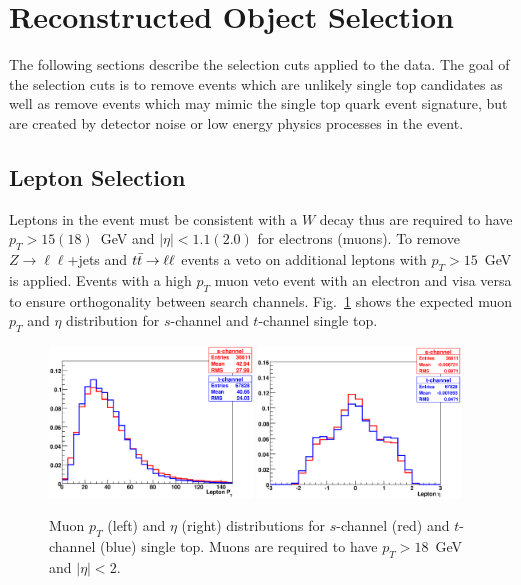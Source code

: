 \section{Reconstructed Object Selection}
\label{objectselection}

The following sections describe the selection cuts applied to the data. The goal of the selection cuts is to remove events which are unlikely single top candidates as well as remove events which may mimic the single top quark event signature, but are created by detector noise or low energy physics processes in the event.


\subsection{Lepton Selection}

Leptons in the event must be consistent with a $W$ decay thus are required to have \mbox{$p_{T}>15 (18)$~GeV} and $|\eta|<1.1(2.0)$ for electrons (muons). To remove $Z \rightarrow \ell \ell$+jets and $\mbox{$t\bar{t}$} \rightarrow \ell \ell$ events a veto on additional leptons with $p_{T}>15$~GeV is applied. Events with a high $p_{T}$ muon veto event with an electron and visa versa to ensure orthogonality between search channels. Fig.~\ref{stmuon} shows the expected muon $p_{T}$ and $\eta$ distribution for $s$-channel and $t$-channel single top.

\begin{figure}[!h!tbp]
\begin{center}
\includegraphics[width=0.48\textwidth]{eps/Analysis/LeptonPt.eps}
\includegraphics[width=0.48\textwidth]{eps/Analysis/LeptonEta.eps}
\end{center}
\vspace{-0.1in}
\caption{Muon $p_{T}$ (left) and $\eta$ (right) distributions for $s$-channel (red) and $t$-channel (blue) single top. Muons are required to have $p_{T}>18$~GeV and $|\eta|<2$.}
\label{stmuon}
\end{figure}

